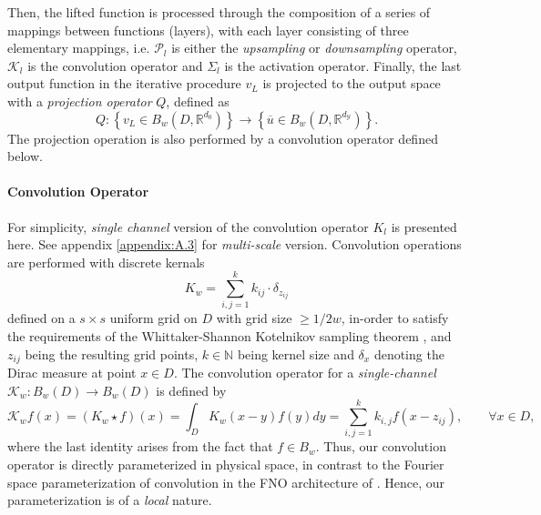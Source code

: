 \documentclass[reqno,10pt]{amsart}
\theoremstyle{plain}
\theoremstyle{definition}
\newcommand{\bb}[1]{\mathbb{#1}}
\newcommand{\cal}[1]{\mathcal{#1}}
\begin{document}
    \noindent Then, the lifted function is processed through the composition of a series of mappings between functions (layers), with each layer consisting of three elementary mappings, i.e. $\cal P_l$ is either the {\it upsampling} or {\it downsampling} operator, $\cal K_l$ is the convolution operator and $\Sigma_l$ is the activation operator. Finally, the last output function in the iterative procedure $v_L$ is projected to the output space with a {\it projection operator} $Q$, defined as 
    $$ Q : \left\{v_L \in B_w(D,\bb R^{d_0}) \right\} \to \left\{\overline{u} \in B_w(D,\bb R^{d_{\cal Y}}) \right\}.$$
    The projection operation is also performed by a convolution operator defined below.

    \paragraph{\bf Convolution Operator} For simplicity, {\it single channel} version of the convolution operator $K_l$ is presented here. See appendix \ref{appendix:A.3} for {\it multi-scale} version. Convolution operations are performed with discrete kernals
    $$ K_w = \sum_{i,j=1}^{k} k_{ij} \cdot \delta_{z_{ij}}$$
    defined on a $s \times s$ uniform grid on $D$ with grid size $\geq 1/2w$, in-order to satisfy the requirements of the Whittaker-Shannon Kotelnikov sampling theorem \cite{MU2000}, and $z_{ij}$ being the resulting grid points, $k \in\bb N$ being kernel size and $\delta_x$ denoting the Dirac measure at point $x\in D$. The convolution operator for a {\it single-channel} $\cal K_w : B_w(D) \to B_w(D)$ is defined by 
    $$ \cal K_wf(x) = (K_w \star f)(x) = \int_D K_w(x-y)f(y) dy = \sum_{i,j=1}^{k} k_{i,j} f(x-z_{ij}), \qquad \forall x\in D,$$
    where the last identity arises from the fact that $f \in B_w$. Thus, our convolution operator is directly parameterized in physical space, in contrast to the Fourier space parameterization of convolution in the FNO architecture of \cite{ZL2021}. Hence, our parameterization is of a {\it local} nature.
\end{document}
